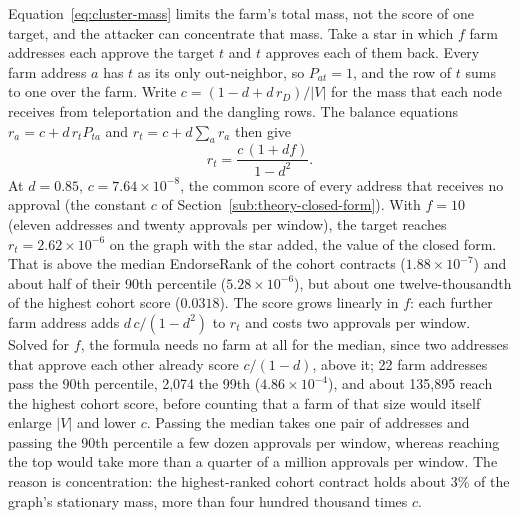 Equation~\eqref{eq:cluster-mass} limits the farm's total mass, not the score of one target, and the attacker can concentrate that mass. Take a star in which $f$ farm addresses each approve the target $t$ and $t$ approves each of them back. Every farm address $a$ has $t$ as its only out-neighbor, so $P_{at}=1$, and the row of $t$ sums to one over the farm. Write $c=(1-d+d\,r_D)/|V|$ for the mass that each node receives from teleportation and the dangling rows. The balance equations $r_a=c+d\,r_t P_{ta}$ and $r_t=c+d\sum_a r_a$ then give
\begin{equation*}
r_t = \frac{c\,(1+df)}{1-d^2}.
\end{equation*}
At $d=0.85$, $c=7.64\times10^{-8}$, the common score of every address that receives no approval (the constant $c$ of Section~\ref{sub:theory-closed-form}). With $f=10$ (eleven addresses and twenty approvals per window), the target reaches $r_t=2.62\times10^{-6}$ on the graph with the star added, the value of the closed form. That is above the median EndorseRank of the cohort contracts ($1.88\times10^{-7}$) and about half of their 90th percentile ($5.28\times10^{-6}$), but about one twelve-thousandth of the highest cohort score ($0.0318$). The score grows linearly in $f$: each further farm address adds $d\,c/(1-d^2)$ to $r_t$ and costs two approvals per window. Solved for $f$, the formula needs no farm at all for the median, since two addresses that approve each other already score $c/(1-d)$, above it; 22 farm addresses pass the 90th percentile, 2{,}074 the 99th ($4.86\times10^{-4}$), and about 135{,}895 reach the highest cohort score, before counting that a farm of that size would itself enlarge $|V|$ and lower $c$. Passing the median takes one pair of addresses and passing the 90th percentile a few dozen approvals per window, whereas reaching the top would take more than a quarter of a million approvals per window. The reason is concentration: the highest-ranked cohort contract holds about 3\% of the graph's stationary mass, more than four hundred thousand times $c$.

